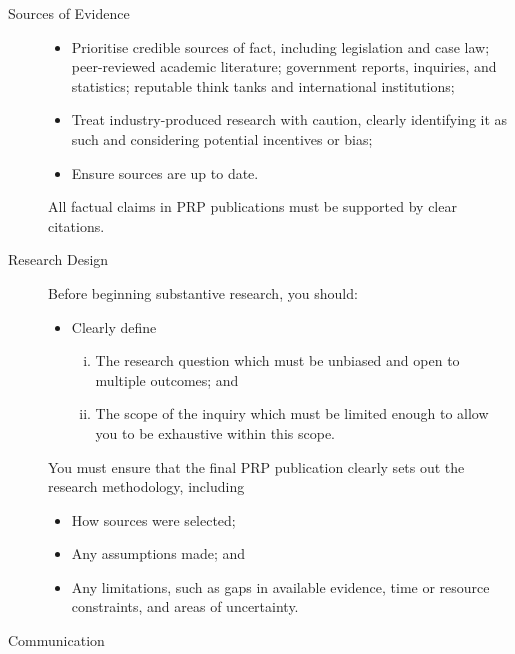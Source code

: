 \documentclass[12pt, a4paper]{article}
\begin{document}
\begin{description}
	\item[Sources of Evidence]
	      \begin{itemize}
		      \item Prioritise credible sources of fact, including legislation and case law; peer-reviewed academic literature; government reports, inquiries, and statistics; reputable think tanks and international institutions;
		      \item Treat industry-produced research with caution, clearly identifying it as such and considering potential incentives or bias;
		      \item Ensure sources are up to date.
	      \end{itemize}
	      All factual claims in PRP publications must be supported by clear citations.

	\item[Research Design]

	      Before beginning substantive research, you should:
	      \begin{itemize}
		      \item Clearly define
		            \begin{enumerate}[(i)]
			            \item The research question which must be unbiased and open to multiple outcomes; and
			            \item The scope of the inquiry which must be limited enough to allow you to be exhaustive within this scope.
		            \end{enumerate}
	      \end{itemize}
	      You must ensure that the final PRP publication clearly sets out the research methodology, including
	      \begin{itemize}
		      \item How sources were selected;
		      \item Any assumptions made; and
		      \item Any limitations, such as gaps in available evidence, time or resource constraints, and areas of uncertainty.
	      \end{itemize}

	\item[Communication]


\end{description}
\end{document}

